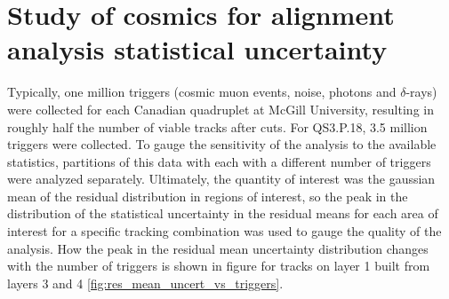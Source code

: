 
\chapter[Analysis statistics]{Study of cosmics for alignment analysis statistical uncertainty}
\label{appendix:statistics}


Typically, one million triggers (cosmic muon events, noise, photons and $\delta$-rays) were collected for each Canadian quadruplet at McGill University, resulting in roughly half the number of viable tracks after cuts. For QS3.P.18, 3.5 million triggers were collected. To gauge the sensitivity of the analysis to the available statistics, partitions of this data with each with a different number of triggers were analyzed separately. Ultimately, the quantity of interest was the gaussian mean of the residual distribution in regions of interest, so the peak in the distribution of the statistical uncertainty in the residual means for each area of interest for a specific tracking combination was used to gauge the quality of the analysis. How the peak in the residual mean uncertainty distribution changes with the number of triggers is shown in figure for tracks on layer 1 built from layers 3 and 4 \ref{fig:res_mean_uncert_vs_triggers}. 

